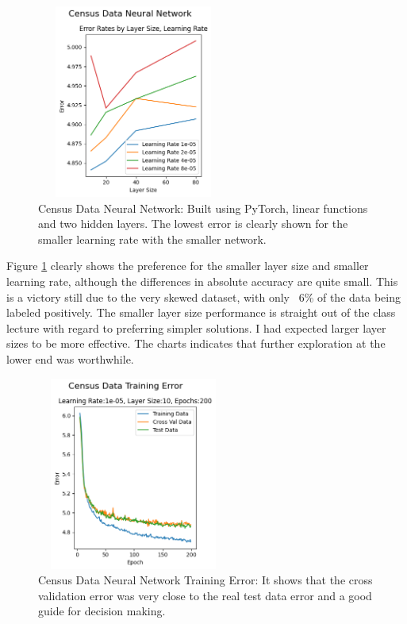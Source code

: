 \documentclass[letterpaper]{article} %
\begin{document}
\begin{figure}[htb]
\centering
\includegraphics[width=2.5in, height=2.5in]{figures/Census_Data_Neural_Network_Error_Rates_by_Layer_Size__Learning_Rate_census.png}
\caption{Census Data Neural Network:  Built using PyTorch, linear functions and two hidden layers.  The lowest error is clearly shown for the smaller learning rate with the smaller network.   }
\label{fig:census_neural_network_start}
\end{figure}

Figure \ref{fig:census_neural_network_start} clearly shows the preference for the smaller layer size and smaller learning rate, although the differences in absolute accuracy are quite small.  This is a victory still due to the very skewed dataset, with only ~6\% of the data being labeled positively.  The smaller layer size performance is straight out of the class lecture with regard to preferring simpler solutions.  I had expected larger layer sizes to be more effective.  The charts indicates that further exploration at the lower end was worthwhile.

\begin{figure}[htb]
\centering
\includegraphics[width=2.5in, height=2.5in]{figures/Census_Data_Training_Error_Learning_Rate_chart_one.png}
\caption{Census Data Neural Network Training Error:  It shows that the cross validation error was very close to the real test data error and a good guide for decision making.  }
\label{fig:census_neural_network_error}
\end{figure}
\end{document}
